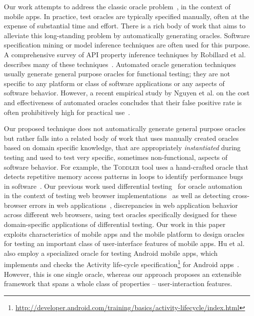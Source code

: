 \label{relatedwork}

Our work attempts to address the classic oracle
problem~\cite{Oracle:Howden78,Weyuker80}, in the context of mobile
apps. In practice, test oracles are typically specified manually,
often at the expense of substantial time and effort. There is a rich
body of work that aims to alleviate this long-standing problem by
automatically generating oracles. Software specification mining or
model inference techniques are often used for this purpose. A
comprehensive survey of API property inference techniques by Robillard
et al. describes many of these
techniques~\cite{robillard13tse}. Automated oracle generation
techniques usually generate general purpose oracles for functional
testing; they are not specific to any platform or class of software
applications or any aspects of software behavior. However, a recent
empirical study by Nguyen et al. on the cost and effectiveness of
automated oracles concludes that their false positive rate is often
prohibitively high for practical use~\cite{Nguyen:2013}.

Our proposed technique does not automatically generate general purpose
oracles but rather falls into a related body of work that uses
manually created oracles based on domain specific knowledge, that are
appropriately \textit{instantiated} during testing and used to test
very specific, sometimes non-functional, aspects of software
behavior. For example, the \textsc{Toddler} tool uses a hand-crafted
oracle that detects repetitive memory access patterns in loops to
identify performance bugs in software~\cite{toddler:ICSE2013}.  Our
previous work used differential testing~\cite{McKeeman1998} for oracle
automation in the context of testing web browser
implementations~\cite{ZaeemKhurshid2012} as well as detecting
cross-browser errors in web applications~\cite{xpert:ICSE2013}, \ie
discrepancies in web application behavior across different web
browsers, using test oracles specifically designed for these
domain-specific applications of differential testing.
Our work in this paper
exploits characteristics of mobile apps and the mobile platform to
design oracles for testing an important class of user-interface
features of mobile apps.  Hu et al. also employ a specialized oracle
for testing Android mobile apps, which implements and checks the
Activity life-cycle
specification\footnote{\url{http://developer.android.com/training/basics/activity-lifecycle/index.html}}
for Android apps~\cite{Hu:2011:AST}.  However, this is one single
oracle, whereas our approach proposes an extensible framework that
spans a whole class of properties -- user-interaction features.

